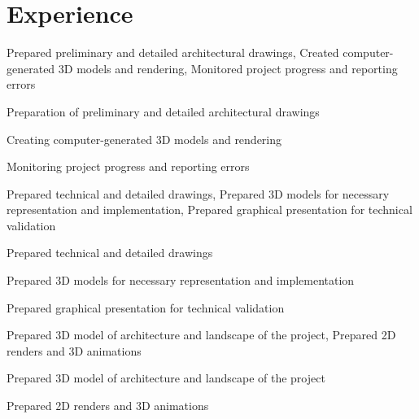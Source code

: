 \betweenProjectsVSpace
\section{Experience}
\betweensummaryPointsVSpace
Prepared preliminary and detailed architectural drawings, Created computer-generated 3D models and rendering, Monitored project progress and reporting errors
\vspace{15pt}
\begin{tightemize}
\item Preparation of preliminary and detailed architectural drawings
\item Creating computer-generated 3D models and rendering
\item Monitoring project progress and reporting errors
\end{tightemize}
\sectionsep

\betweenProjectsVSpace
{}
\betweensummaryPointsVSpace
Prepared technical and detailed drawings, Prepared 3D models for necessary representation and implementation, Prepared graphical presentation for technical validation
\vspace{10pt}
\begin{tightemize}
\item Prepared technical and detailed drawings
\item Prepared 3D models for necessary representation and implementation
\item Prepared graphical presentation for technical validation
\end{tightemize}
\sectionsep

\betweenProjectsVSpace
{}
\betweensummaryPointsVSpace
Prepared 3D model of architecture and landscape of the project, Prepared 2D renders and 3D animations
\vspace{10pt}
\begin{tightemize}
\item Prepared 3D model of architecture and landscape of the project
\item Prepared 2D renders and 3D animations
\end{tightemize}
\sectionsep

